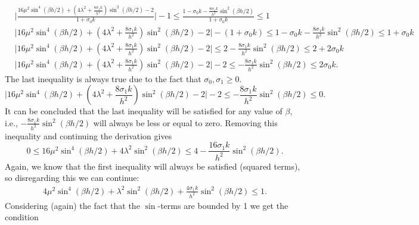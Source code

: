 \documentclass{article}
\def\SWcomment[#1]{\textcolor{blue}{#1}}
\begin{document}
\begin{equation}\nonumber
    \begin{aligned}
        &\Bigg|\frac{16\mu^2\sin^4(\beta h/2)+(4\lambda^2+\frac{8\sigma_1k}{h^2})\sin^2(\beta h/2) - 2}{1+\sigma_0k}\Bigg|-1 \leq \frac{1-\sigma_0k-\frac{8\sigma_1k}{h^2}\sin^2(\beta h/2)}{1+\sigma_0k}\leq 1\\
        &\Bigg|16\mu^2\sin^4(\beta h/2)+(4\lambda^2+\frac{8\sigma_1k}{h^2})\sin^2(\beta h/2) - 2\Bigg|-(1+\sigma_0k) \leq 1-\sigma_0k-\frac{8\sigma_1k}{h^2}\sin^2(\beta h/2)\leq 1+\sigma_0k\\
        &\Big|16\mu^2\sin^4(\beta h/2)+(4\lambda^2+\frac{8\sigma_1k}{h^2})\sin^2(\beta h/2) - 2\Big|\leq2-\frac{8\sigma_1k}{h^2}\sin^2(\beta h/2)\leq2+2\sigma_0k\\
        &\Big|16\mu^2\sin^4(\beta h/2)+(4\lambda^2+\frac{8\sigma_1k}{h^2})\sin^2(\beta h/2) - 2\Big|-2\leq-\frac{8\sigma_1k}{h^2}\sin^2(\beta h/2)\leq2\sigma_0k.
    \end{aligned}
\end{equation}
The last inequality is always true due to the fact that $\sigma_0,\sigma_1 \geq 0$.  
\begin{equation}
        \Big|16\mu^2\sin^4(\beta h/2)+(4\lambda^2+\frac{8\sigma_1k}{h^2})\sin^2(\beta h/2) - 2\Big|-2\leq-\frac{8\sigma_1k}{h^2}\sin^2(\beta h/2)\leq0.
\end{equation}
It can be concluded that the last inequality will be satisfied for any value of $\beta$, i.e., $-\frac{8\sigma_1k}{h^2}\sin^2(\beta h/2)$ will always be less or equal to zero. Removing this inequality and continuing the derivation gives
\begin{equation}
    0 \leq 16\mu^2\sin^4(\beta h/2) + 4\lambda^2\sin^2(\beta h/2) \leq 4-\frac{16\sigma_1k}{h^2}\sin^2(\beta h/2).
\end{equation}
Again, we know that the first inequality will always be satisfied (squared terms), so disregarding this we can continue:
\begin{equation}
    \begin{aligned}
        4\mu^2\sin^4(\beta h/2) + \lambda^2\sin^2(\beta h/2)+\frac{4\sigma_1k}{h^2}\sin^2(\beta h/2) \leq 1.
    \end{aligned}
\end{equation}
Considering (again) the fact that the $\sin$-terms are bounded by 1 we get the condition
\end{document}
